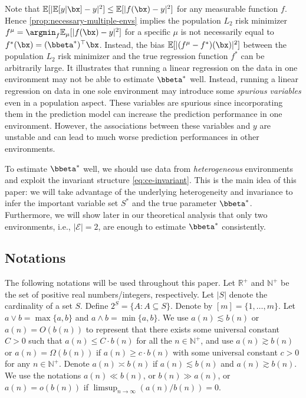 \documentclass[10pt]{article}
\numberwithin{equation}{section}
\begin{document}
{Note that $\mathbb{E} [|\mathbb{E}[y|\bx] - y|^2] \le \mathbb{E} [|f(\bx) - y|^2]$ for any measurable function $f$. Hence \cref{prop:necessary-multiple-envs} implies the population $L_2$ risk minimizer $f^{\mu} = \argmin_f \mathbb{E}_\mu [|f(\bx) - y|^2]$ for a specific $\mu$ is not necessarily equal to $f^*(\bx) = (\bbeta^*)^\top \bx$. Instead, the bias $\mathbb{E}[|(f^{\mu} - f^{*})(\bx)|^2]$ between the population $L_2$ risk minimizer and the true regression function $f^*$ can be arbitrarily large. It illustrates that running a linear regression on the data in one environment may not be able to estimate $\bbeta^*$ well. Instead, running a linear regression on data in one sole environment may introduce some \emph{spurious variables} even in a population aspect. These variables are spurious since incorporating them in the prediction model can increase the prediction performance in one environment. However, the associations between these variables and $y$ are unstable and can lead to much worse prediction performances in other environments.

To estimate $\bbeta^*$ well, we should use data from \emph{heterogeneous} environments and exploit the invariant structure \eqref{eq:ce-invariant}. This is the main idea of this paper: we will take advantage of the underlying heterogeneity and invariance to infer the important variable set $S^*$ and the true parameter $\bbeta^*$. Furthermore, we will show later in our theoretical analysis that only two environments, i.e., $|\mathcal{E}|=2$, are enough to estimate $\bbeta^*$ consistently.

\subsection{Notations}

The following notations will be used throughout this paper. Let $\mathbb{R}^+$ and $\mathbb{N}^+$ be the set of positive real numbers/integers, respectively. Let $|S|$ denote the cardinality of a set $S$. Define $2^S = \{A: A\subseteq S\}$. Denote by $[m]=\{1,\ldots, m\}$. Let $a\lor b = \max\{a,b\}$ and $a\land b = \min\{a,b\}$. We use $a(n) \lesssim b(n)$ or $a(n) = O(b(n))$ to represent that there exists some universal constant $C>0$ such that $a(n) \le C\cdot b(n)$ for all the $n \in \mathbb{N}^+$, and use $a(n) \gtrsim b(n)$ or $a(n) = \Omega(b(n))$ if $a(n) \ge c \cdot b(n)$ with some universal constant $c>0$ for any $n\in \mathbb{N}^+$. Denote $a(n) \asymp b(n)$ if $a(n) \lesssim b(n)$ and $a(n)\gtrsim b(n)$. We use the notations $a(n) \ll b(n)$, or $b(n) \gg a(n)$, or $a(n) = o(b(n))$ if $\limsup_{n\to\infty} (a(n) / b(n)) = 0$.

}
\end{document}
